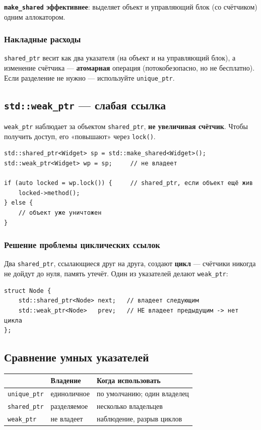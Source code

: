\textbf{\texttt{make\_shared} эффективнее}: выделяет объект и управляющий блок
(со счётчиком) одним аллокатором.

\subsubsection{Накладные расходы}

\texttt{shared\_ptr} весит как два указателя (на объект и на управляющий блок),
а изменение счётчика --- \textbf{атомарная} операция (потокобезопасно, но не
бесплатно). Если разделение не нужно --- используйте \texttt{unique\_ptr}.

\subsection{\texttt{std::weak\_ptr} --- слабая ссылка}

\texttt{weak\_ptr} наблюдает за объектом \texttt{shared\_ptr}, \textbf{не увеличивая
счётчик}. Чтобы получить доступ, его «повышают» через \texttt{lock()}.

\begin{lstlisting}
std::shared_ptr<Widget> sp = std::make_shared<Widget>();
std::weak_ptr<Widget> wp = sp;     // не владеет

if (auto locked = wp.lock()) {     // shared_ptr, если объект ещё жив
    locked->method();
} else {
    // объект уже уничтожен
}
\end{lstlisting}

\subsubsection{Решение проблемы циклических ссылок}

Два \texttt{shared\_ptr}, ссылающиеся друг на друга, создают \textbf{цикл} ---
счётчики никогда не дойдут до нуля, память утечёт. Один из указателей делают
\texttt{weak\_ptr}:

\begin{lstlisting}
struct Node {
    std::shared_ptr<Node> next;   // владеет следующим
    std::weak_ptr<Node>   prev;   // НЕ владеет предыдущим -> нет цикла
};
\end{lstlisting}

\subsection{Сравнение умных указателей}

\begin{center}
\begin{tabular}{lp{4cm}p{4.5cm}}
\toprule
& \textbf{Владение} & \textbf{Когда использовать} \\
\midrule
\texttt{unique\_ptr} & единоличное & по умолчанию; один владелец \\
\addlinespace
\texttt{shared\_ptr} & разделяемое & несколько владельцев \\
\addlinespace
\texttt{weak\_ptr}   & не владеет  & наблюдение, разрыв циклов \\
\bottomrule
\end{tabular}
\end{center}

